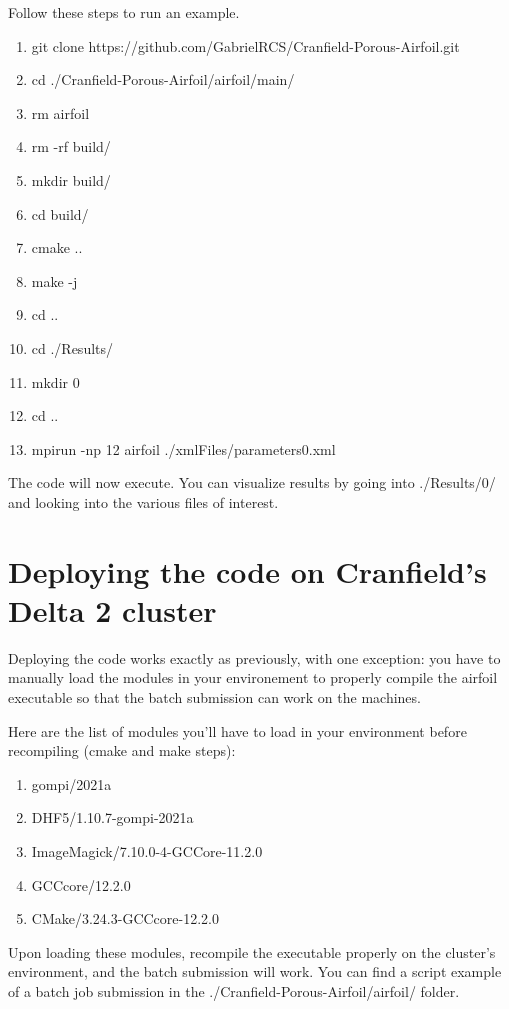 \documentclass{article}
\begin{document}
Follow these steps to run an example.

\begin{enumerate}
    \item git clone https://github.com/GabrielRCS/Cranfield-Porous-Airfoil.git
    \item cd ./Cranfield-Porous-Airfoil/airfoil/main/
    \item rm airfoil
    \item rm -rf build/
    \item mkdir build/
    \item cd build/
    \item cmake ..
    \item make -j
    \item cd ..
    \item cd ./Results/
    \item mkdir 0
    \item cd ..
    \item mpirun -np 12 airfoil ./xmlFiles/parameters\textunderscore 0.xml
\end{enumerate}

The code will now execute. 
You can visualize results by going into ./Results/0/ and looking into the various files of interest.

\section{Deploying the code on Cranfield's Delta 2 cluster}
Deploying the code works exactly as previously, with one exception: you have to manually load the modules in your environement to properly compile the airfoil executable so that the batch submission can work on the machines. 

Here are the list of modules you'll have to load in your environment before recompiling (cmake and make steps):
\begin{enumerate}
    \item gompi/2021a
    \item DHF5/1.10.7-gompi-2021a
    \item ImageMagick/7.10.0-4-GCCore-11.2.0
    \item GCCcore/12.2.0
    \item CMake/3.24.3-GCCcore-12.2.0
\end{enumerate}

Upon loading these modules, recompile the executable properly on the cluster's environment, and the batch submission will work. 
You can find a script example of a batch job submission in the ./Cranfield-Porous-Airfoil/airfoil/ folder. 
\end{document}
